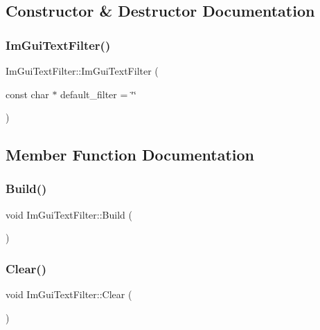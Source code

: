 \subsection{Constructor \& Destructor Documentation}
\hypertarget{struct_im_gui_text_filter_a0a61ee76f0b4f3c354791734b06e3140}{}\label{struct_im_gui_text_filter_a0a61ee76f0b4f3c354791734b06e3140} 
\subsubsection{\texorpdfstring{Im\+Gui\+Text\+Filter()}{ImGuiTextFilter()}}
{\footnotesize\ttfamily Im\+Gui\+Text\+Filter\+::\+Im\+Gui\+Text\+Filter (\begin{DoxyParamCaption}\item[{const char $\ast$}]{default\+\_\+filter = {\ttfamily \char`\"{}\char`\"{}} }\end{DoxyParamCaption})}



\subsection{Member Function Documentation}
\hypertarget{struct_im_gui_text_filter_aef362baafaa9dfa62d11bc6101c0f4c1}{}\label{struct_im_gui_text_filter_aef362baafaa9dfa62d11bc6101c0f4c1} 
\subsubsection{\texorpdfstring{Build()}{Build()}}
{\footnotesize\ttfamily void Im\+Gui\+Text\+Filter\+::\+Build (\begin{DoxyParamCaption}{ }\end{DoxyParamCaption})}

\hypertarget{struct_im_gui_text_filter_a9043c1f0c33d29e6fc9b75ae81f9705a}{}\label{struct_im_gui_text_filter_a9043c1f0c33d29e6fc9b75ae81f9705a} 
\subsubsection{\texorpdfstring{Clear()}{Clear()}}
{\footnotesize\ttfamily void Im\+Gui\+Text\+Filter\+::\+Clear (\begin{DoxyParamCaption}{ }\end{DoxyParamCaption})}

